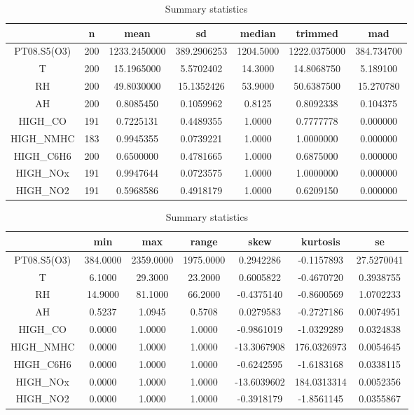 \begin{table}[h]
  \centering
  \begin{tabular}{|c|c|c|c|c|c|c|}
    \hline
    & n & mean & sd & median & trimmed & mad\\
    \hline
    PT08.S5(O3) & 200 & 1233.2450000 & 389.2906253 & 1204.5000 & 1222.0375000 & 384.734700\\
    \hline
    T & 200 & 15.1965000 & 5.5702402 & 14.3000 & 14.8068750 & 5.189100\\
    \hline
    RH & 200 & 49.8030000 & 15.1352426 & 53.9000 & 50.6387500 & 15.270780\\
    \hline
    AH & 200 & 0.8085450 & 0.1059962 & 0.8125 & 0.8092338 & 0.104375\\
    \hline
    HIGH\_CO & 191 & 0.7225131 & 0.4489355 & 1.0000 & 0.7777778 & 0.000000\\
    \hline
    HIGH\_NMHC & 183 & 0.9945355 & 0.0739221 & 1.0000 & 1.0000000 & 0.000000\\
    \hline
    HIGH\_C6H6 & 200 & 0.6500000 & 0.4781665 & 1.0000 & 0.6875000 & 0.000000\\
    \hline
    HIGH\_NOx & 191 & 0.9947644 & 0.0723575 & 1.0000 & 1.0000000 & 0.000000\\
    \hline
    HIGH\_NO2 & 191 & 0.5968586 & 0.4918179 & 1.0000 & 0.6209150 & 0.000000\\
    \hline
  \end{tabular}
  
  \begin{tabular}{|c|c|c|c|c|c|c|}
    \hline
    & min & max & range & skew & kurtosis & se\\
    \hline
    PT08.S5(O3) & 384.0000 & 2359.0000 & 1975.0000 & 0.2942286 & -0.1157893 & 27.5270041\\
    \hline
    T & 6.1000 & 29.3000 & 23.2000 & 0.6005822 & -0.4670720 & 0.3938755\\
    \hline
    RH & 14.9000 & 81.1000 & 66.2000 & -0.4375140 & -0.8600569 & 1.0702233\\
    \hline
    AH & 0.5237 & 1.0945 & 0.5708 & 0.0279583 & -0.2727186 & 0.0074951\\
    \hline
    HIGH\_CO  & 0.0000 & 1.0000 & 1.0000 & -0.9861019 & -1.0329289 & 0.0324838\\
    \hline
    HIGH\_NMHC & 0.0000 & 1.0000 & 1.0000 & -13.3067908 & 176.0326973 & 0.0054645\\
    \hline
    HIGH\_C6H6 & 0.0000 & 1.0000 & 1.0000 & -0.6242595 & -1.6183168 & 0.0338115\\
    \hline
    HIGH\_NOx & 0.0000 & 1.0000 & 1.0000 & -13.6039602 & 184.0313314 & 0.0052356\\
    \hline
    HIGH\_NO2 & 0.0000 & 1.0000 & 1.0000 & -0.3918179 & -1.8561145 & 0.0355867\\
    \hline
  \end{tabular}  

  \caption{Summary statistics}
\end{table}
